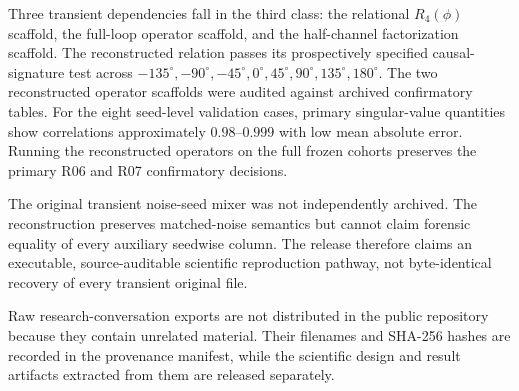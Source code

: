 \documentclass[11pt]{article}
\begin{document}
Three transient dependencies fall in the third class: the relational $R_4(\phi)$ scaffold, the full-loop operator scaffold, and the half-channel factorization scaffold. The reconstructed relation passes its prospectively specified causal-signature test across $-135^\circ,-90^\circ,-45^\circ,0^\circ,45^\circ,90^\circ,135^\circ,180^\circ$. The two reconstructed operator scaffolds were audited against archived confirmatory tables. For the eight seed-level validation cases, primary singular-value quantities show correlations approximately $0.98$--$0.999$ with low mean absolute error. Running the reconstructed operators on the full frozen cohorts preserves the primary R06 and R07 confirmatory decisions.

The original transient noise-seed mixer was not independently archived. The reconstruction preserves matched-noise semantics but cannot claim forensic equality of every auxiliary seedwise column. The release therefore claims an executable, source-auditable scientific reproduction pathway, not byte-identical recovery of every transient original file.

Raw research-conversation exports are not distributed in the public repository because they contain unrelated material. Their filenames and SHA-256 hashes are recorded in the provenance manifest, while the scientific design and result artifacts extracted from them are released separately.
\end{document}
